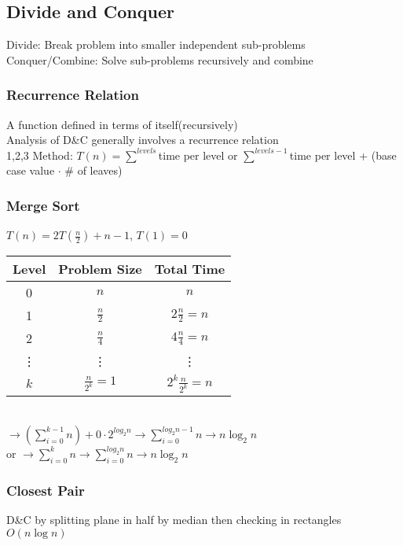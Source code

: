 \documentclass{article}
\begin{document}
\begin{multicols*}{2}
        \subsection*{Divide and Conquer}
        Divide: Break problem into smaller independent sub-problems\\
        Conquer/Combine: Solve sub-problems recursively and combine
        \subsubsection*{Recurrence Relation}
        A function defined in terms of itself(recursively)\\
        Analysis of D\&C generally involves a recurrence relation\\
        1,2,3 Method: $T(n) = \sum^{levels}$time per level or
        $\sum^{levels-1}$time per level + (base case value $\cdot$ \# of leaves)
        \subsubsection*{Merge Sort}
        $T(n) = 2T(\frac{n}{2}) + n-1$, $T(1) = 0$\\
        \begin{tabular}{c|c|c}
            Level  & Problem Size        & Total Time               \\
            \hline
            0      & $n$                 & $n$                      \\
            1      & $\frac{n}{2}$       & $2\frac{n}{2} = n$       \\
            2      & $\frac{n}{4}$       & $4\frac{n}{4} = n$       \\
            \vdots & \vdots              & \vdots                   \\
            $k$    & $\frac{n}{2^k} = 1$ & $2^{k}\frac{n}{2^k} = n$ \\
        \end{tabular}\\
        $\to (\sum\limits_{i=0}^{k-1} n) + 0 \cdot 2^{log_2 n} \to \sum\limits_{i=0}^{log_2 n -
        1} n \to n\log_2 n$\\
        or $\to \sum\limits_{i=0}^{k} n \to \sum\limits_{i=0}^{log_2 n} n \to n\log_2 n$
        \subsubsection*{Closest Pair}
        D\&C by splitting plane in half by median then checking in rectangles\\
        $O(n\log n)$

\end{multicols*}
\end{document}
